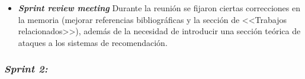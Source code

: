 \begin{itemize}
	Como se puede comprobar, no todos los objetivos marcados fueron cumplidos: la estimación del tiempo fue demasiado optimista, además de no contar con el tiempo requerido en solucionar problemas técnicos (\LaTeX{}). Se dejó para próximos sprints la lectura del último paper.
	
	\item \textbf{\textit{Sprint review meeting}}
	Durante la reunión se fijaron ciertas correcciones en la memoria (mejorar referencias bibliográficas y la sección de <<Trabajos relacionados>>), además de la necesidad de introducir una sección teórica de ataques a los sistemas de recomendación.
	
	
\end{itemize}


\subsubsection{\textit{Sprint 2:}}


